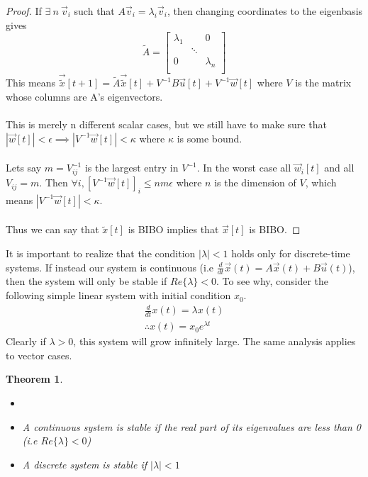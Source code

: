 \documentclass{article}
\newtheorem{theorem}{Theorem}
\newtheorem{proof}{Proof}
\begin{document}
\begin{proof}
    If $\exists \> n \> \vec{v}_i$ such that $A\vec{v}_i=\lambda_i\vec{v}_i$, then changing coordinates to the eigenbasis gives
    $$\tilde{A}=
        \left[
        \begin{array}{ccc}
        \lambda_1 &  & 0 \\
         & \ddots &  \\
        0 &  & \lambda_n \\
        \end{array}
        \right] $$
    This means $\vec{\tilde{x}}[t+1]=\tilde{A}\vec{\tilde{x}}[t]+V^{-1}B\vec{u}[t]+V^{-1}\vec{w}[t]$ where $V$ is the matrix whose columns are A's eigenvectors.
    \\\\This is merely n different scalar cases, but we still have to make sure that $|\vec{w}[t]|<\epsilon \implies |V^{-1}\vec{w}[t]|<\kappa$ where $\kappa$ is some bound.
    \\\\Lets say $m=V_{ij}^{-1}$ is the largest entry in $V^{-1}$. In the worst case all $\vec{w}_i[t]$ and all $V_{ij}=m$.
    Then $\forall i, \left[V^{-1}\vec{w}[t]\right]_i \leq n m \epsilon$ where $n$ is the dimension of $V$, which means $|V^{-1}\vec{w}[t]|<\kappa$.
    \\\\Thus we can say that $\tilde{x}[t]$ is BIBO implies that $\vec{x}[t]$ is BIBO.
\end{proof}
It is important to realize that the condition $|\lambda|<1$ holds only for discrete-time systems. If instead our system is continuous (i.e $\frac{d}{dt}\vec{x}(t)=A\vec{x}(t)+B\vec{u}(t)$),
then the system will only be stable if $Re\{\lambda\}<0$. To see why, consider the following simple linear system with initial condition $x_0$.
\[
    \begin{array}{c}
        \frac{d}{dt}x(t) = \lambda x(t)\\
        \therefore x(t) = x_0 e^{\lambda t}
    \end{array}
\]
Clearly if $\lambda > 0$, this system will grow infinitely large. The same analysis applies to vector cases.
\begin{theorem}
    \begin{itemize}
        \item[]
        \item[1. ] A continuous system is stable if the real part of its eigenvalues are less than 0 (i.e $Re\{\lambda\} < 0$)
        \item[2. ] A discrete system is stable if $|\lambda| < 1$
    \end{itemize}
\end{theorem}
\end{document}
